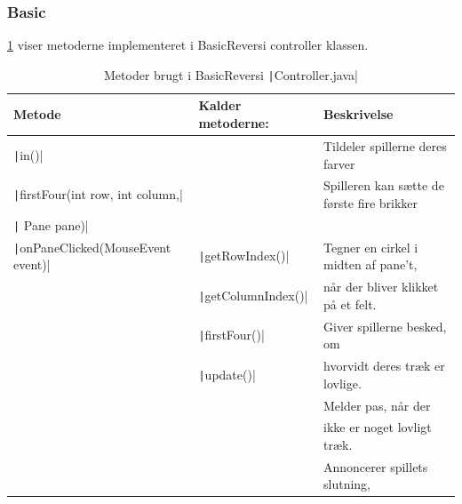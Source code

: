 \subsubsection{Basic}
\cref{tbl:1} viser metoderne implementeret i BasicReversi controller klassen.
\begin{table}[H]
    \centering
    \caption{Metoder brugt i BasicReversi \texttt|Controller.java|}\label{tbl:1}
    \begin{tabular}{lll}
        \toprule
        Metode                                              & Kalder metoderne:                   & Beskrivelse                                         \\
        \midrule
        \texttt|in()|                             &                                     & Tildeler spillerne deres farver                     \\
        \texttt|firstFour(int row, int column,|   &                                     & Spilleren kan sætte de første fire brikker          \\
        \quad \texttt| Pane pane)|                &                                     &                                                     \\
        \texttt|onPaneClicked(MouseEvent event)|  & \texttt|getRowIndex()|    & Tegner en cirkel i midten af pane't,                \\
                                                            & \texttt|getColumnIndex()| & når der bliver klikket på et felt.                  \\
                                                            & \texttt|firstFour()|      & Giver spillerne besked, om                          \\
                                                            & \texttt|update()|         & hvorvidt deres træk er lovlige.                     \\
                                                            &                                     & Melder pas, når der                                 \\
                                                            &                                     & ikke er noget lovligt træk.                         \\
                                                            &                                     & Annoncerer spillets slutning,                       \\

\end{tabular}
\end{table}
